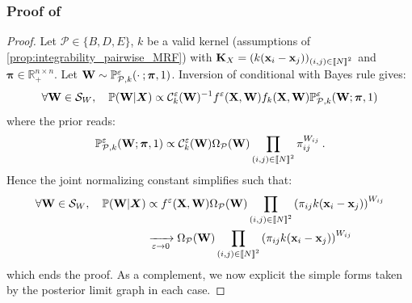 \subsubsection{Proof of }
\label{proof:posterior_limit}

\posteriorW

\begin{proof}
Let $\mathcal{P} \in \{B, D, E\}$, $k$ be a valid kernel (assumptions of \cref{prop:integrability_pairwise_MRF}) with $\mathbf{K}_{X} = (k(\mathbf{x}_{i} - \mathbf{x}_{j}))_{(i,j) \in {[\![N]\!]}^2}$ and $\bm{\pi} \in \mathbb{R}_+^{n \times n}$. Let $\mathbf{W} \sim \mathbb{P}_{\mathcal{P},k}^{\varepsilon}(\cdot \: ; \bm{\pi},1)$. Inversion of conditional with Bayes rule gives:
\begin{align}
    \forall {\mathbf{W}} \in \mathcal{S}_{W}, \quad \mathbb{P}(\mathbf{W} | \bm{X}) \propto
    \mathcal{C}_{k}^{\varepsilon}(\mathbf{W})^{-1} f^{\varepsilon}(\mathbf{X}, \mathbf{W}) f_{k}(\mathbf{X}, \mathbf{W}) \mathbb{P}^{\varepsilon}_{\mathcal{P},k}(\mathbf{W}; \bm{\pi}, 1) \label{inversion_Conditional}
\end{align}
where the prior reads:
\begin{align}
    \mathbb{P}_{\mathcal{P},k}^{\varepsilon}({\mathbf{W}}; \bm{\pi}, 1) \propto \mathcal{C}^{\varepsilon}_k(\mathbf{W}) \Omega_{\mathcal{P}}(\mathbf{W}) \prod_{(i,j) \in {[\![N]\!]}^2} \pi_{ij}^{W_{ij}} \:.
\end{align}
Hence the joint normalizing constant simplifies such that:
\begin{align}
    \forall {\mathbf{W}} \in \mathcal{S}_{W}, \quad \mathbb{P}(\mathbf{W} | \bm{X}) &\propto
    f^{\varepsilon}(\mathbf{X}, \mathbf{W}) \Omega_{\mathcal{P}}(\mathbf{W}) \prod_{(i,j) \in {[\![N]\!]}^2} \left(\pi_{ij} k(\mathbf{x}_i - \mathbf{x}_j)\right)^{W_{ij}} \\
    &\xrightarrow[\varepsilon \to 0]{} \Omega_{\mathcal{P}}(\mathbf{W}) \prod_{(i,j) \in {[\![N]\!]}^2}  \left(\pi_{ij} k(\mathbf{x}_i - \mathbf{x}_j)\right)^{W_{ij}}
\end{align}
which ends the proof. As a complement, we now explicit the simple forms taken by the posterior limit graph in each case.


\end{proof}
